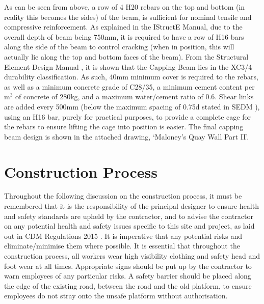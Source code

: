 \documentclass[12pt, a4paper]{article}
\begin{document}
\begin{justify}
As can be seen from above, a row of 4 H20 rebars on the top and bottom (in reality this becomes the sides) of the beam, is sufficient for nominal tensile and compressive reinforcement. As explained in the IStructE Manual, due to the overall depth of beam being 750mm, it is required to have a row of H16 bars along the side of the beam to control cracking (when in position, this will actually lie along the top and bottom faces of the beam). From the Structural Element Design Manual \cite{j}, it is shown that the Capping Beam lies in the XC3/4 durability classification. As such, 40mm minimum cover is required to the rebars, as well as a minimum concrete grade of C28/35, a minimum cement content per m$^3$ of concrete of 280kg, and a maximum water/cement ratio of 0.6. Shear links are added every 500mm (below the maximum spacing of 0.75d stated in SEDM \cite{j}), using an H16 bar, purely for practical purposes, to provide a complete cage for the rebars to ensure lifting the cage into position is easier. The final capping beam design is shown in the attached drawing, `Maloney's Quay Wall Part II'.
\end{justify}
\section{Construction Process}
\begin{justify}
Throughout the following discussion on the construction process, it must be remembered that it is the responsibility of the principal designer to ensure health and safety standards are upheld by the contractor, and to advise the contractor on any potential health and safety issues specific to this site and project, as laid out in CDM Regulations 2015 \cite{k}. It is imperative that any potential risks and eliminate/minimise them where possible. It is essential that throughout the construction process, all workers wear high visibility clothing and safety head and foot wear at all times. Appropriate signs should be put up by the contractor to warn employees of any particular risks. A safety barrier should be placed along the edge of the existing road, between the road and the old platform, to ensure employees do not stray onto the unsafe platform without authorisation.
\end{justify}
\
\end{document}
